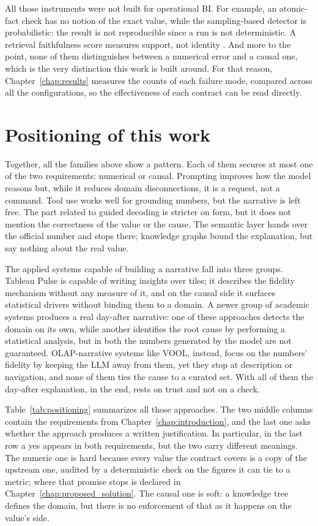 \documentclass[12pt,a4paper,openright,twoside]{book}
\begin{document}
All those instruments were not built for operational \ac{BI}.
For example, an atomic-fact check has no notion of the exact value, while the sampling-based detector is probabilistic: the result is not reproducible since a run is not deterministic.
A retrieval faithfulness score measures support, not identity \cite{es2023ragas}. 
And more to the point, none of them distinguishes between a numerical error and a causal one, which is the very distinction this work is built around.
For that reason, Chapter~\ref{chap:results} measures the counts of each failure mode, compared across all the configurations, so the effectiveness of each contract can be read directly. 


\section{Positioning of this work}
Together, all the families above show a pattern. 
Each of them secures at most one of the two requirements: numerical or causal.
Prompting improves how the model reasons but, while it reduces domain disconnections, it is a request, not a command.
Tool use works well for grounding numbers, but the narrative is left free.
The part related to guided decoding is stricter on form, but it does not mention the correctness of the value or the cause.
The semantic layer hands over the official number and stops there; knowledge graphs bound the explanation, but say nothing about the real value.

The applied systems capable of building a narrative fall into three groups.
Tableau Pulse is capable of writing insights over tiles; it describes the fidelity mechanism without any measure of it, and on the causal side it surfaces statistical drivers without binding them to a domain.
A newer group of academic systems produces a real day-after narrative: one of these approaches detects the domain on its own, while another identifies the root cause by performing a statistical analysis, but in both the numbers generated by the model are not guaranteed.
\ac{OLAP}-narrative systems like VOOL, instead, focus on the numbers' fidelity by keeping the \ac{LLM} away from them, yet they stop at description or navigation, and none of them ties the cause to a curated set.
With all of them the day-after explanation, in the end, rests on trust and not on a check.


Table~\ref{tab:positioning} summarizes all those approaches. 
The two middle columns contain the requirements from Chapter~\ref{chap:introduction}, and the last one asks whether the approach produces a written justification.
In particular, in the last row a yes appears in both requirements, but the two carry different meanings. 
The numeric one is hard because every value the contract covers is a copy of the upstream one, audited by a deterministic check on the figures it can tie to a metric; where that promise stops is declared in Chapter~\ref{chap:proposed_solution}.
The causal one is soft: a knowledge tree defines the domain, but there is no enforcement of that as it happens on the value's side.
\end{document}

